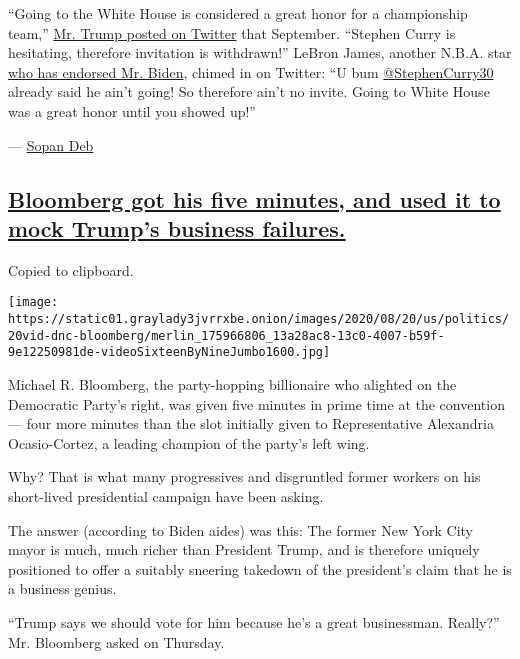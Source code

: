 ``Going to the White House is considered a great honor for a
championship team,''
\href{https://twitter.com/realDonaldTrump/status/911572182060453893}{Mr.
Trump posted on Twitter} that September. ``Stephen Curry is hesitating,
therefore invitation is withdrawn!'' LeBron James, another N.B.A. star
\href{https://www.tmz.com/2020/08/19/lebron-james-joe-biden-kamala-harris-campaign-trump-president/}{who
has endorsed Mr. Biden}, chimed in on Twitter: ``U bum
\href{https://twitter.com/StephenCurry30}{@StephenCurry30} already said
he ain't going! So therefore ain't no invite. Going to White House was a
great honor until you showed up!''

--- \href{https://www.nytimes3xbfgragh.onion/by/sopan-deb}{Sopan Deb}

\hypertarget{bloomberg-got-his-five-minutes-and-used-it-to-mock-trumps-business-failures}{%
\subsection{\texorpdfstring{\protect\hyperlink{bloomberg-got-his-five-minutes-and-used-it-to-mock-trumps-business-failures}{Bloomberg
got his five minutes, and used it to mock Trump's business
failures.}}{Bloomberg got his five minutes, and used it to mock Trump's business failures.}}\label{bloomberg-got-his-five-minutes-and-used-it-to-mock-trumps-business-failures}}

Copied to clipboard.

\texttt{[image: https://static01.graylady3jvrrxbe.onion/images/2020/08/20/us/politics/20vid-dnc-bloomberg/merlin\_175966806\_13a28ac8-13c0-4007-b59f-9e12250981de-videoSixteenByNineJumbo1600.jpg]}

Michael R. Bloomberg, the party-hopping billionaire who alighted on the
Democratic Party's right, was given five minutes in prime time at the
convention --- four more minutes than the slot initially given to
Representative Alexandria Ocasio-Cortez, a leading champion of the
party's left wing.

Why? That is what many progressives and disgruntled former workers on
his short-lived presidential campaign have been asking.

The answer (according to Biden aides) was this: The former New York City
mayor is much, much richer than President Trump, and is therefore
uniquely positioned to offer a suitably sneering takedown of the
president's claim that he is a business genius.

``Trump says we should vote for him because he's a great businessman.
Really?'' Mr. Bloomberg asked on Thursday.

